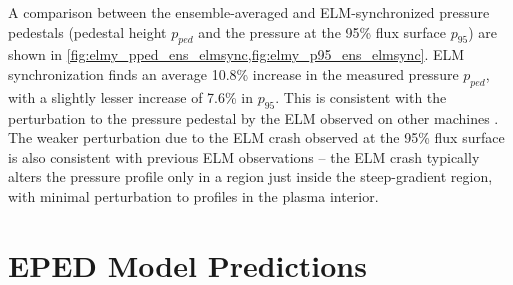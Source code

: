 \begin{figure}[h]
 \pushtooutside
\end{figure}

A comparison between the ensemble-averaged and ELM-synchronized pressure pedestals (pedestal height $p_{ped}$ and the pressure at the 95\% flux surface $p_{95}$) are shown in \cref{fig:elmy_pped_ens_elmsync,fig:elmy_p95_ens_elmsync}.  ELM synchronization finds an average 10.8\% increase in the measured pressure $p_{ped}$, with a slightly lesser increase of 7.6\% in $p_{95}$.  This is consistent with the perturbation to the pressure pedestal by the ELM observed on other machines \cite{Urano2003,Loarte2003}.  The weaker perturbation due to the ELM crash observed at the 95\% flux surface is also consistent with previous ELM observations -- the ELM crash typically alters the pressure profile only in a region just inside the steep-gradient region, with minimal perturbation to profiles in the plasma interior.\nicesectionending

\section{EPED Model Predictions}\label{sec:elmy_eped}

